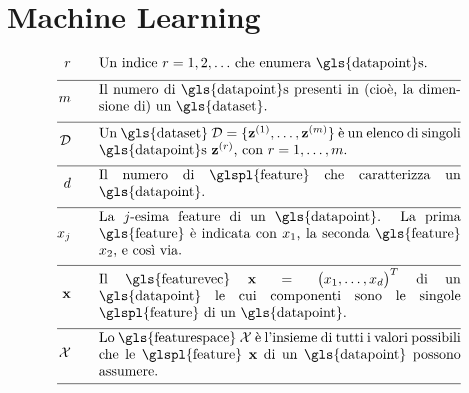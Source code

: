 \newpage
\section*{Machine Learning}

\begin{align}
	\sampleidx \quad\quad & \parbox{.75\textwidth}{Un indice $\sampleidx=1,2,\ldots$ che enumera \gls{datapoint}s.}   \nonumber \\[2mm] \hline \nonumber\\[-5mm]
	\samplesize \quad\quad &\parbox{.75\textwidth}{Il numero di  \gls{datapoint}s presenti in (cioè, la dimensione di) un \gls{dataset}.} \nonumber \\[2mm] \hline \nonumber\\[-5mm] 
	\dataset \quad\quad & \parbox{.75\textwidth}{Un \gls{dataset} $\dataset = \{ \datapoint^{(1)},\ldots, \datapoint^{(\samplesize)} \}$ 
		è un elenco di singoli \gls{datapoint}s $\datapoint^{(\sampleidx)}$, con $\sampleidx=1,\ldots,\samplesize$.}   \nonumber \\[2mm] \hline \nonumber\\[-5mm]
	\featurelen \quad\quad &\parbox{.75\textwidth}{Il numero di \glspl{feature} che caratterizza un \gls{datapoint}.}\nonumber \\[2mm] \hline \nonumber\\[-5mm]
	\feature_{\featureidx} \quad\quad &\parbox{.75\textwidth}{La $\featureidx$-esima feature di un \gls{datapoint}. La prima \gls{feature} 
		è indicata con $\feature_{1}$, la seconda \gls{feature} $\feature_{2}$, e così via. } \nonumber \\[2mm] \hline \nonumber\\[-5mm] 
	\featurevec \quad\quad &\parbox{.75\textwidth}{Il \gls{featurevec} $\featurevec=\big(\feature_{1},\ldots,\feature_{\featuredim}\big)^{T}$ di un \gls{datapoint} le cui componenti sono le singole \glspl{feature} di un \gls{datapoint}.}\nonumber \\[2mm] \hline \nonumber\\[-5mm]
	\featurespace \quad\quad & \parbox{.75\textwidth}{Lo \gls{featurespace} $\featurespace$ è l'insieme di tutti i valori possibili che le \glspl{feature} $\featurevec$ di un \gls{datapoint} possono assumere.} \nonumber \\[2mm] \hline \nonumber\\[-5mm]

\end{align}
